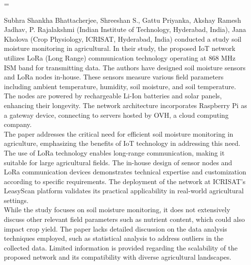 =\documentclass[12pt, a4paper]{article}
\begin{document}
Subhra Shankha Bhattacherjee, Shreeshan S., Gattu Priyanka, Akshay Ramesh Jadhav, P. Rajalakshmi (Indian Institute of Technology, Hyderabad, India), Jana Kholova (Crop Physiology, ICRISAT, Hyderabad, India)\cite{bhattacherjee2020cloud} conducted a study soil moisture monitoring in agricultural.
In their study, the proposed IoT network utilizes LoRa (Long Range) communication technology operating
at 868 MHz ISM band for transmitting data. The authors have designed soil moisture sensors and LoRa nodes in-house. These sensors measure various field parameters including ambient temperature, humidity, soil moisture, and soil temperature. The nodes are powered by rechargeable Li-Ion batteries and solar panels, enhancing their longevity. The network architecture incorporates Raspberry Pi as a gateway device, connecting to servers hosted by OVH, a cloud computing company.\\
The paper addresses the critical need for efficient soil moisture monitoring in agriculture,
emphasizing the benefits of IoT technology in addressing this need. The use of LoRa technology enables long-range communication, making it suitable for large agricultural fields. The in-house design of sensor nodes and LoRa communication devices demonstrates technical expertise and customization according to specific requirements. The deployment of the network at ICRISAT's LeasyScan platform validates its practical applicability in real-world agricultural settings.\\
While the study focuses on soil moisture monitoring, it does not extensively discuss other relevant field parameters such as nutrient content, which could also impact crop yield. The paper lacks detailed discussion on the data analysis techniques employed, such as statistical analysis to address outliers in the collected data. Limited information is provided regarding the scalability of the proposed network and its compatibility with diverse agricultural landscapes.
\end{document}
